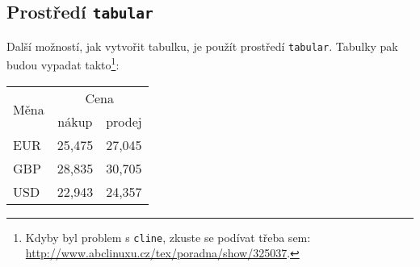 \documentclass[11pt]{article}
\begin{document}
        \subsection{Prostředí \texttt{tabular}}
            Další možností, jak vytvořit tabulku, je použít prostředí \verb|tabular|. Tabulky pak budou vypadat takto\footnote[1]{Kdyby byl problem s \verb|cline|, zkuste se podívat třeba sem: \href{http://www.abclinuxu.cz/tex/poradna/show/325037}{http://www.abclinuxu.cz/tex/poradna/show/325037}.}:

            \begin{center}
                \begin{tabular}{|l|c|c|}
                    \hline
                    \multirow{2}{*}{Měna} & \multicolumn{2}{|c|}{Cena} \\

                                            \cline { 2 - 3 }
                                            & nákup     & prodej \\

                    \hline
                                EUR         & 25,475    & 27,045    \\
                                GBP         & 28,835    & 30,705    \\
                                USD         & 22,943    & 24,357    \\
                    \hline
                \end{tabular}
            \end{center}
\end{document}
